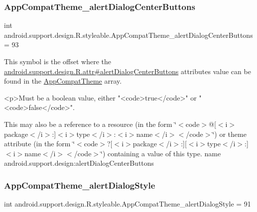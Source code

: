 \subsubsection{\texorpdfstring{App\+Compat\+Theme\+\_\+alert\+Dialog\+Center\+Buttons}{AppCompatTheme\_alertDialogCenterButtons}}
{\footnotesize\ttfamily int android.\+support.\+design.\+R.\+styleable.\+App\+Compat\+Theme\+\_\+alert\+Dialog\+Center\+Buttons = 93\hspace{0.3cm}{\ttfamily [static]}}

This symbol is the offset where the \hyperlink{classandroid_1_1support_1_1design_1_1R_1_1attr_a287951aa624e31d8150f3870825b706d}{android.\+support.\+design.\+R.\+attr\#alert\+Dialog\+Center\+Buttons} attribute\textquotesingle{}s value can be found in the \hyperlink{classandroid_1_1support_1_1design_1_1R_1_1styleable_afb351dc8de20cbd4c89abe360373010c}{App\+Compat\+Theme} array.

\begin{DoxyVerb}      <p>Must be a boolean value, either "<code>true</code>" or "<code>false</code>".
\end{DoxyVerb}
 

This may also be a reference to a resource (in the form \char`\"{}$<$code$>$@\mbox{[}$<$i$>$package$<$/i$>$\+:\mbox{]}$<$i$>$type$<$/i$>$\+:$<$i$>$name$<$/i$>$$<$/code$>$\char`\"{}) or theme attribute (in the form \char`\"{}$<$code$>$?\mbox{[}$<$i$>$package$<$/i$>$\+:\mbox{]}\mbox{[}$<$i$>$type$<$/i$>$\+:\mbox{]}$<$i$>$name$<$/i$>$$<$/code$>$\char`\"{}) containing a value of this type.  name android.\+support.\+design\+:alert\+Dialog\+Center\+Buttons \mbox{\label{classandroid_1_1support_1_1design_1_1R_1_1styleable_ac70cd07091cc32fa36cbc2c66306ee94}} 
\subsubsection{\texorpdfstring{App\+Compat\+Theme\+\_\+alert\+Dialog\+Style}{AppCompatTheme\_alertDialogStyle}}
{\footnotesize\ttfamily int android.\+support.\+design.\+R.\+styleable.\+App\+Compat\+Theme\+\_\+alert\+Dialog\+Style = 91\hspace{0.3cm}{\ttfamily [static]}}

